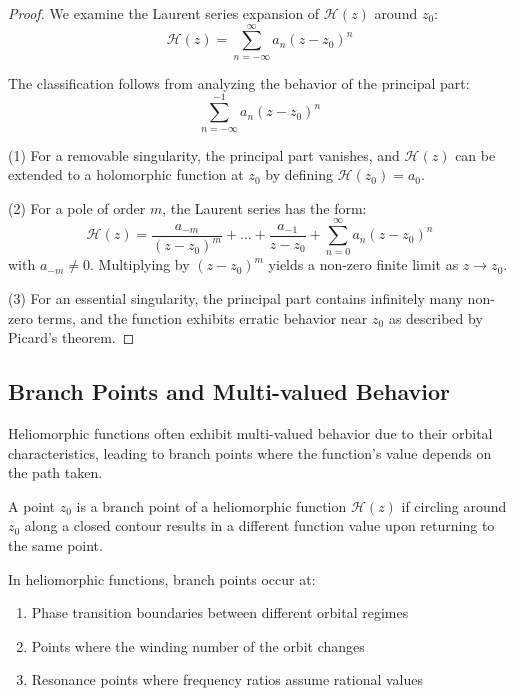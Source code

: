\begin{definition}
\begin{enumerate}
\begin{proof}
We examine the Laurent series expansion of $\mathcal{H}(z)$ around $z_0$:
\begin{equation}
\mathcal{H}(z) = \sum_{n=-\infty}^{\infty} a_n (z-z_0)^n
\end{equation}

The classification follows from analyzing the behavior of the principal part:
\begin{equation}
\sum_{n=-\infty}^{-1} a_n (z-z_0)^n
\end{equation}

(1) For a removable singularity, the principal part vanishes, and $\mathcal{H}(z)$ can be extended to a holomorphic function at $z_0$ by defining $\mathcal{H}(z_0) = a_0$.

(2) For a pole of order $m$, the Laurent series has the form:
\begin{equation}
\mathcal{H}(z) = \frac{a_{-m}}{(z-z_0)^m} + \ldots + \frac{a_{-1}}{z-z_0} + \sum_{n=0}^{\infty} a_n (z-z_0)^n
\end{equation}
with $a_{-m} \neq 0$. Multiplying by $(z-z_0)^m$ yields a non-zero finite limit as $z \to z_0$.

(3) For an essential singularity, the principal part contains infinitely many non-zero terms, and the function exhibits erratic behavior near $z_0$ as described by Picard's theorem.
\end{proof}

\subsection{Branch Points and Multi-valued Behavior}

Heliomorphic functions often exhibit multi-valued behavior due to their orbital characteristics, leading to branch points where the function's value depends on the path taken.

\begin{definition}
A point $z_0$ is a branch point of a heliomorphic function $\mathcal{H}(z)$ if circling around $z_0$ along a closed contour results in a different function value upon returning to the same point.
\end{definition}

\begin{theorem}
In heliomorphic functions, branch points occur at:
\begin{enumerate}
    \item Phase transition boundaries between different orbital regimes
    \item Points where the winding number of the orbit changes
    \item Resonance points where frequency ratios assume rational values
\end{enumerate}
\end{theorem}


\end{enumerate}
\end{definition}
